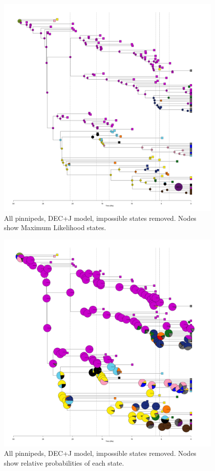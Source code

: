 \documentclass[a4paper, 12pt]{article}
\begin{document}
\begin{figure}[H]
 \centering
  \includegraphics[width = \linewidth]{figures/all-pinnipeds-DECj-impossible-MLstates.png}
  \caption{All pinnipeds, DEC+J model, impossible states removed. Nodes show Maximum Likelihood states.}
  \label{fig-all-decj-ml}
\end{figure} 

\begin{figure}[H]
 \centering
  \includegraphics[width = \linewidth]{figures/all-pinnipeds-DECj-impossible-pies.png}
  \caption{All pinnipeds, DEC+J model, impossible states removed. Nodes show relative probabilities of each state.}
  \label{fig-all-decj-pie}
\end{figure} 
 
\end{document}
